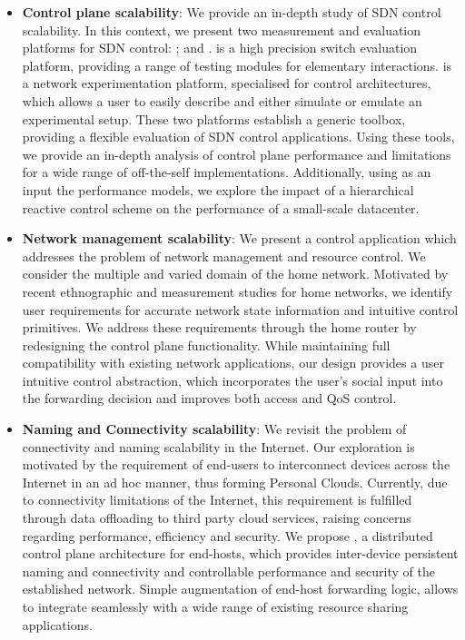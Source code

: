 \begin{itemize}
  \item \textbf{Control plane scalability}: We provide an in-depth study of SDN
  control scalability. In this context, we present two measurement and
  evaluation platforms for SDN control: \oflops; and \sdnsim. \oflops is a high
  precision switch evaluation platform, providing a range of testing modules
  for elementary \of interactions. \sdnsim is a network experimentation
  platform, specialised for \of control architectures, which allows a user to
  easily describe and either simulate or emulate an experimental setup. These
  two platforms establish a generic toolbox, providing a flexible evaluation of
  SDN control applications. Using these tools, we provide an in-depth analysis
  of control plane performance and limitations for a  wide range of
  off-the-self \of implementations. Additionally, using as an input the
  \oflops performance models, we explore the impact of a hierarchical reactive
  control  scheme on the performance of a small-scale datacenter. 
 
  \item \textbf{Network management scalability}: We present a control
  application which addresses the problem of network management and resource
  control. We consider the multiple and varied domain of the home network.
  Motivated by recent ethnographic and measurement studies for home networks,
  we identify user requirements for accurate network state information and
  intuitive control primitives. We address these requirements through the home
  router by redesigning the control plane functionality.  While maintaining
  full compatibility with existing network applications, our design provides a
  user intuitive control abstraction, which incorporates the user's social
  input into the forwarding decision and improves both access and QoS control.

  \item \textbf{Naming and Connectivity scalability}: We revisit the problem of
      connectivity and naming scalability in the Internet.  Our exploration is
      motivated by the requirement of end-users to interconnect devices across
      the Internet in an ad hoc manner, thus forming Personal Clouds.
      Currently, due to connectivity limitations of the Internet, this
      requirement is fulfilled through data offloading to third party cloud
      services, raising concerns regarding performance, efficiency and
      security.  We propose \signpost, a distributed control plane architecture
      for end-hosts, which provides inter-device persistent naming and
      connectivity and controllable performance and security of the established
      network. Simple augmentation of end-host forwarding logic, allows
      \signpost to integrate seamlessly with a wide range of existing resource
      sharing applications.
\end{itemize}


